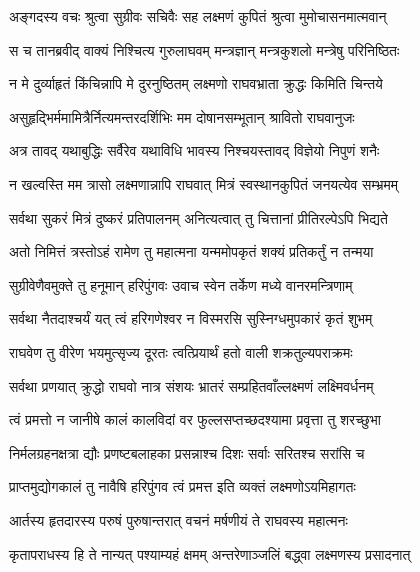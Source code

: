 
\twolineshloka
{अङ्गदस्य वचः श्रुत्वा सुग्रीवः सचिवैः सह}
{लक्ष्मणं कुपितं श्रुत्वा मुमोचासनमात्मवान्} %

\twolineshloka
{स च तानब्रवीद् वाक्यं निश्चित्य गुरुलाघवम्}
{मन्त्रज्ञान् मन्त्रकुशलो मन्त्रेषु परिनिष्ठितः} %

\twolineshloka
{न मे दुर्व्याहृतं किंचिन्नापि मे दुरनुष्ठितम्}
{लक्ष्मणो राघवभ्राता क्रुद्धः किमिति चिन्तये} %

\twolineshloka
{असुहृद्भिर्ममामित्रैर्नित्यमन्तरदर्शिभिः}
{मम दोषानसम्भूतान् श्रावितो राघवानुजः} %

\twolineshloka
{अत्र तावद् यथाबुद्धिः सर्वैरेव यथाविधि}
{भावस्य निश्चयस्तावद् विज्ञेयो निपुणं शनैः} %

\twolineshloka
{न खल्वस्ति मम त्रासो लक्ष्मणान्नापि राघवात्}
{मित्रं स्वस्थानकुपितं जनयत्येव सम्भ्रमम्} %

\twolineshloka
{सर्वथा सुकरं मित्रं दुष्करं प्रतिपालनम्}
{अनित्यत्वात् तु चित्तानां प्रीतिरल्पेऽपि भिद्यते} %

\twolineshloka
{अतो निमित्तं त्रस्तोऽहं रामेण तु महात्मना}
{यन्ममोपकृतं शक्यं प्रतिकर्तुं न तन्मया} %

\twolineshloka
{सुग्रीवेणैवमुक्ते तु हनूमान् हरिपुंगवः}
{उवाच स्वेन तर्केण मध्ये वानरमन्त्रिणाम्} %

\twolineshloka
{सर्वथा नैतदाश्चर्यं यत् त्वं हरिगणेश्वर}
{न विस्मरसि सुस्निग्धमुपकारं कृतं शुभम्} %

\twolineshloka
{राघवेण तु वीरेण भयमुत्सृज्य दूरतः}
{त्वत्प्रियार्थं हतो वाली शक्रतुल्यपराक्रमः} %

\twolineshloka
{सर्वथा प्रणयात् क्रुद्धो राघवो नात्र संशयः}
{भ्रातरं सम्प्रहितवाँल्लक्ष्मणं लक्ष्मिवर्धनम्} %

\twolineshloka
{त्वं प्रमत्तो न जानीषे कालं कालविदां वर}
{फुल्लसप्तच्छदश्यामा प्रवृत्ता तु शरच्छुभा} %

\twolineshloka
{निर्मलग्रहनक्षत्रा द्यौः प्रणष्टबलाहका}
{प्रसन्नाश्च दिशः सर्वाः सरितश्च सरांसि च} %

\twolineshloka
{प्राप्तमुद्योगकालं तु नावैषि हरिपुंगव}
{त्वं प्रमत्त इति व्यक्तं लक्ष्मणोऽयमिहागतः} %

\twolineshloka
{आर्तस्य हृतदारस्य परुषं पुरुषान्तरात्}
{वचनं मर्षणीयं ते राघवस्य महात्मनः} %

\twolineshloka
{कृतापराधस्य हि ते नान्यत् पश्याम्यहं क्षमम्}
{अन्तरेणाञ्जलिं बद्ध्वा लक्ष्मणस्य प्रसादनात्} %

